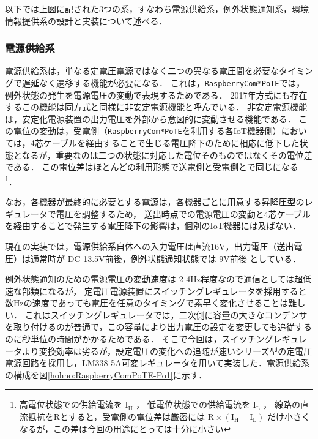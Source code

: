
以下では上図に記された3つの系，すなわち電源供給系，例外状態通知系，環境情報提供系の設計と実装について述べる．


\subsubsection{電源供給系}
\vspace{-0.5zh}


電源供給系は，単なる定電圧電源ではなく二つの異なる電圧間を必要なタイミングで遅延なく遷移する機能が必要になる．
これは，{\tt Raspberry\-Com*PoTE}では，例外状態の発生を電源電圧の変動で表現するためである．
2017年方式にも存在するこの機能は同方式と同様に非安定電源機能と呼んでいる．
非安定電源機能は，安定化電源装置の出力電圧を外部から意図的に変動させる機能である．
この電位の変動は，受電側（{\tt Raspberry\-Com*PoTE}を利用する各IoT機器側）においては，4芯ケーブルを経由することで生じる電圧降下のために相応に低下した状態となるが，重要なのは二つの状態に対応した電位そのものではなくその電位差である．
この電位差はほとんどの利用形態で送電側と受電側とで同じになる
\footnote{高電位状態での供給電流を $\text{I}_\text{H}$ ，
  低電位状態での供給電流を $\text{I}_\text{L}$ ，
  線路の直流抵抗をRとすると，受電側の電位差は厳密には
  $ \text{R} \times (\text{I}_\text{H} - \text{I}_\text{L}) $
  だけ小さくなるが，この差は今回の用途にとっては十分に小さい}．

なお，各機器が最終的に必要とする電源は，各機器ごとに用意する昇降圧型のレギュレータで電圧を調整するため，
送出時点での電源電圧の変動と4芯ケーブルを経由することで発生する電圧降下の影響は，個別のIoT機器には及ばない．

現在の実装では，電源供給系自体への入力電圧は直流16V，出力電圧（送出電圧）は通常時が DC 13.5V前後，例外状態通知状態では 9V前後 としている．

例外状態通知のための電源電圧の変動速度は 2-4Hz程度なので通信としては超低速な部類になるが，
定電圧電源装置にスイッチングレギュレータを採用すると数Hzの速度であっても電圧を任意のタイミングで素早く変化させることは難しい．
これはスイッチングレギュレータでは，二次側に容量の大きなコンデンサを取り付けるのが普通で，この容量により出力電圧の設定を変更しても追従するのに秒単位の時間がかかるためである．
そこで今回は，スイッチングレギュレータより変換効率は劣るが，設定電圧の変化への追随が速いシリーズ型の定電圧電源回路を採用し，LM338 5A可変レギュレータ\cite{data:LM338}を用いて実装した．電源供給系の構成を図\ref{hohno:RaspberryComPoTE-Po1}に示す．

